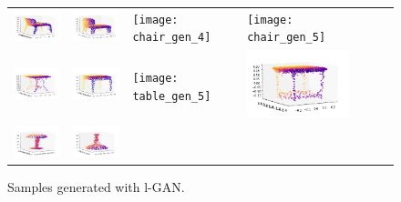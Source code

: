 \documentclass[12pt]{article}
\begin{document}
    \begin{figure}
        \centering
        \begin{tabular}{lllllll}
            \includegraphics[width = 30mm]{chair_latent_gen_1} &
            \includegraphics[width = 30mm]{chair_latent_gen_2} &
            \texttt{[image: chair\_gen\_4]} &
            \texttt{[image: chair\_gen\_5]} \\
            \includegraphics[width = 30mm]{table_latent_gen_1} &
            \includegraphics[width = 30mm]{table_latent_gen_2} &
            \texttt{[image: table\_gen\_5]} &
            \includegraphics[width = 30mm]{table_latent_gen_4} \\
            \includegraphics[width = 30mm]{lamp_latent_gen_1} &
            \includegraphics[width = 30mm]{lamp_latent_gen_2} \\

        \end{tabular}
        \caption{Samples generated with l-GAN.}
        \label{figure:samples_generated_with_latent_gan}
    \end{figure}
\end{document}
